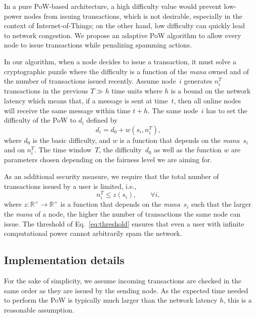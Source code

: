 \documentclass[../main.tex]{subfiles}
\begin{document}
In a pure PoW-based architecture, a high difficulty value would prevent low-power nodes from issuing transactions, which is not desirable, especially in the context of Internet-of-Things; on the other hand, low difficulty can quickly lead to network congestion. We propose an adaptive PoW algorithm to allow every node to issue transactions while penalizing spamming actions.

In our algorithm, when a node decides to issue a transaction, it must solve a cryptographic puzzle where the difficulty is a function of the \textit{mana} owned and of the number of transactions issued recently.
Assume node~$i$ generates $n_i^T$ transactions in the previous $T\gg h$ time units where $h$ is a bound on the network latency which means that, if a message is sent at time~$t$, then all online nodes will receive the same message within time $t + h$. The same node~$i$ has to set the difficulty of the PoW to $d_i$ defined by
\begin{equation*}
    d_i = d_0 + w(s_i, n_i^T),
\end{equation*}
where $d_0$ is the basic difficulty, and $w$ is a function that depends on the \textit{mana}~$s_i$ and on $n_i^T$.
The time window~$T$, the difficulty~$d_0$ as well as the function $w$ are parameters chosen depending on the fairness level we are aiming for.

As an additional security measure, we require that the total number of transactions issued by a user is limited, i.e.,
\begin{equation}\label{eq:threshold}
    n_i^T \leq z(s_i), \qquad \forall i,
\end{equation}
where $z:\mathbb{R}^+\rightarrow\mathbb{R}^+$ is a function that depends on the \textit{mana}~$s_i$ such that the larger the \textit{mana} of a node, the higher the number of transactions the same node can issue.
The threshold of Eq.~\eqref{eq:threshold} ensures that even a user with infinite computational power cannot arbitrarily spam the network.

\subsection{Implementation details}

For the sake of simplicity, we assume incoming transactions are checked in the same order as they are issued by the sending node.
As the expected time needed to perform the PoW is typically much larger than the network latency $h$, this is a reasonable assumption.
\end{document}

